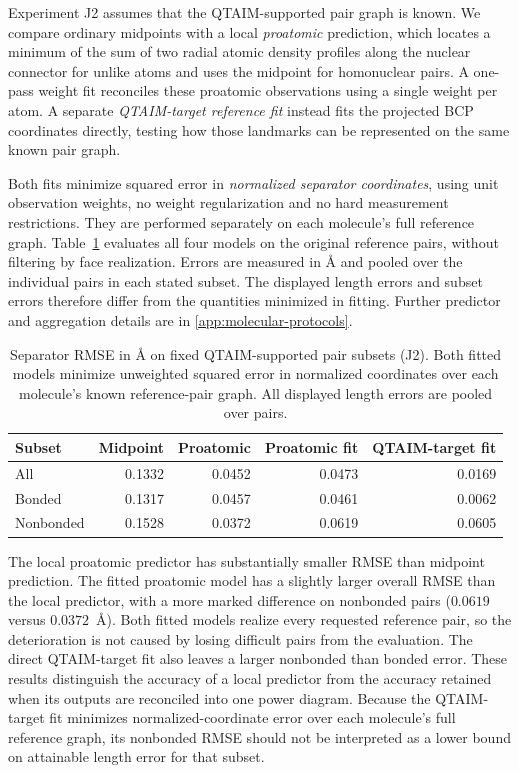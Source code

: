Experiment J2 assumes that the QTAIM-supported pair graph is known. We compare ordinary midpoints with a local \emph{proatomic} prediction, which locates a minimum of the sum of two radial atomic density profiles along the nuclear connector for unlike atoms and uses the midpoint for homonuclear pairs. A one-pass weight fit reconciles these proatomic observations using a single weight per atom. A separate \emph{QTAIM-target reference fit} instead fits the projected BCP coordinates directly, testing how those landmarks can be represented on the same known pair graph.

Both fits minimize squared error in \emph{normalized separator coordinates}, using unit observation weights, no weight regularization and no hard measurement restrictions. They are performed separately on each molecule's full reference graph. Table~\ref{tab:molecular-fits} evaluates all four models on the original reference pairs, without filtering by face realization. Errors are measured in \AA{} and pooled over the individual pairs in each stated subset. The displayed length errors and subset errors therefore differ from the quantities minimized in fitting. Further predictor and aggregation details are in \ref{app:molecular-protocols}.

\begin{table}[htbp]
\centering
\footnotesize
\setlength{\tabcolsep}{4pt}
\caption{Separator RMSE in \AA{} on fixed QTAIM-supported pair subsets (J2). Both fitted models minimize unweighted squared error in normalized coordinates over each molecule's known reference-pair graph. All displayed length errors are pooled over pairs.}
\label{tab:molecular-fits}
\begin{tabular}{@{}lrrrr@{}}
\toprule
Subset & Midpoint & Proatomic & Proatomic fit & QTAIM-target fit \\
\midrule
All & 0.1332 & 0.0452 & 0.0473 & 0.0169 \\
Bonded & 0.1317 & 0.0457 & 0.0461 & 0.0062 \\
Nonbonded & 0.1528 & 0.0372 & 0.0619 & 0.0605 \\
\bottomrule
\end{tabular}
\end{table}

The local proatomic predictor has substantially smaller RMSE than midpoint prediction. The fitted proatomic model has a slightly larger overall RMSE than the local predictor, with a more marked difference on nonbonded pairs ($0.0619$ versus $0.0372$~\AA{}). Both fitted models realize every requested reference pair, so the deterioration is not caused by losing difficult pairs from the evaluation. The direct QTAIM-target fit also leaves a larger nonbonded than bonded error. These results distinguish the accuracy of a local predictor from the accuracy retained when its outputs are reconciled into one power diagram. Because the QTAIM-target fit minimizes normalized-coordinate error over each molecule's full reference graph, its nonbonded RMSE should not be interpreted as a lower bound on attainable length error for that subset.

